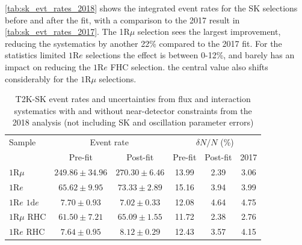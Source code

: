 \autoref{tab:sk_evt_rates_2018} shows the integrated event rates for the SK selections before and after the fit, with a comparison to the 2017 result in \autoref{tab:sk_evt_rates_2017}. The 1$\text{R}\mu$ selection sees the largest improvement, reducing the systematics by another 22\% compared to the 2017 fit. For the statistics limited $1\text{R}e$ selections the effect is between 0-12\%, and barely has an impact on reducing the $1\text{R}e$ FHC selection. the central value also shifts considerably for the $1\text{R}\mu$ selections.
\begin{table}
	\begin{tabular}{l | c c | c c | c}
		\hline
		\hline
		Sample & \multicolumn{2}{c|}{Event rate} & \multicolumn{3}{c}{$\delta N/N$ (\%)} \\
		& Pre-fit & Post-fit & Pre-fit & Post-fit & 2017 \\
		\hline
		$1\text{R}\mu$ & $249.86\pm34.96$ & $270.30\pm6.46$ & 13.99 & 2.39 & 3.06\\
		$1\text{R}e$ & $65.62\pm9.95$ & $73.33\pm2.89$ & 15.16 &  3.94 &  3.99  \\
		$1\text{R}e \text{ 1d}e$ & $7.70\pm0.93$ & $7.02\pm0.33$ & 12.08 & 4.64 & 4.75 \\
		
		$1\text{R}\mu \text{ RHC}$ & $61.50\pm7.21$ & $65.09\pm1.55$ & 11.72 & 2.38 & 2.76 \\
		$1\text{R}e \text{ RHC}$ & $7.64\pm0.95$ & $8.12\pm0.29$ & 12.43 & 3.57 & 4.15 \\
		\hline
		\hline
	\end{tabular}
	\caption{T2K-SK event rates and uncertainties from flux and interaction systematics with and without near-detector constraints from the 2018 analysis (not including SK and oscillation parameter errors)}
	\label{tab:sk_evt_rates_2018}
\end{table}

